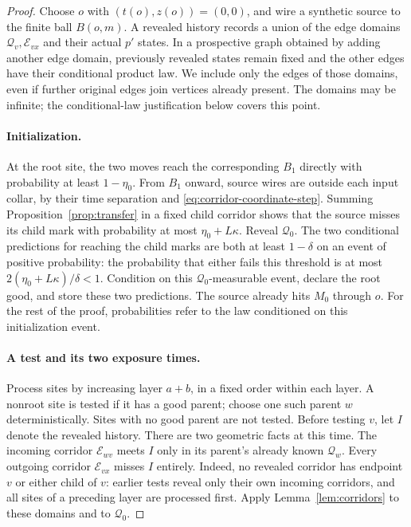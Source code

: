 \begin{proof}
Choose $o$ with $(t(o),z(o))=(0,0)$, and wire a synthetic source to
the finite ball $B(o,m)$. A revealed history
records a union of the edge domains $\mathcal Q_v,\mathcal E_{vx}$
and their actual $p'$ states. In a prospective graph obtained by adding
another edge domain, previously revealed states remain fixed and the
other edges have their conditional product law. We include only the
edges of those domains, even if further original edges join vertices
already present. The domains may be infinite; the conditional-law
justification below covers this point.

\paragraph{Initialization.}
At the root site, the two moves reach the corresponding $B_1$ directly
with probability at least $1-\eta_0$. From $B_1$ onward, source wires
are outside each input collar, by their time separation and
\eqref{eq:corridor-coordinate-step}. Summing
Proposition~\ref{prop:transfer} in a fixed child corridor shows that
the source misses its child mark with probability at most
$\eta_0+L\kappa$. Reveal $\mathcal Q_0$. The two conditional
predictions for reaching the child marks are both at least
$1-\delta$ on an event of positive probability: the probability
that either fails this threshold is at most
$2(\eta_0+L\kappa)/\delta<1$. Condition on this
$\mathcal Q_0$-measurable event, declare the root good, and store
these two predictions. The source already hits $M_0$ through $o$.
For the rest of the proof, probabilities refer to the law conditioned
on this initialization event.

\paragraph{A test and its two exposure times.}
Process sites by increasing layer $a+b$, in a fixed order within
each layer. A nonroot site is tested if it has a good parent; choose
one such parent $w$ deterministically. Sites with no good parent are
not tested. Before testing $v$, let $I$ denote the revealed history.
There are two geometric facts at this time. The incoming corridor
$\mathcal E_{wv}$ meets $I$ only in its parent's already known
$\mathcal Q_w$. Every outgoing corridor $\mathcal E_{vx}$ misses $I$
entirely. Indeed, no revealed corridor has endpoint $v$ or either child
of $v$: earlier tests reveal only their own incoming corridors, and
all sites of a preceding layer are processed first. Apply
Lemma~\ref{lem:corridors} to these domains and to $\mathcal Q_0$.


\end{proof}
